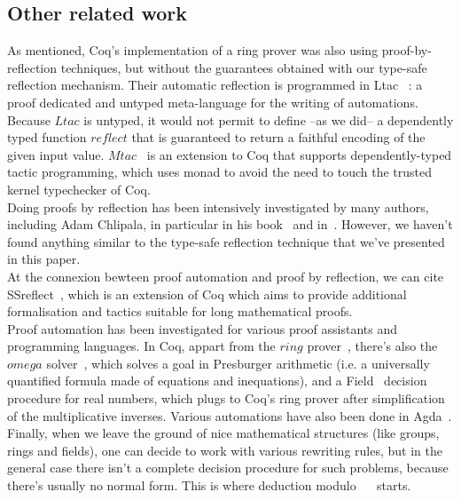 	\subsection{Other related work}
	
As mentioned, Coq's implementation of a ring prover was also using proof-by-reflection techniques, but without the guarantees obtained with our type-safe reflection mechanism. Their automatic reflection is programmed in Ltac~\cite{DelahayeLTac} : a proof dedicated and untyped meta-language for the writing of automations. Because $Ltac$ is untyped, it would not permit to define --as we did-- a dependently typed function $reflect$ that is guaranteed to return a faithful encoding of the given input value. $Mtac$~\cite{Ziliani13} is an extension to Coq that supports dependently-typed tactic programming, which uses monad to avoid the need to touch the trusted kernel typechecker of Coq.
\\

Doing proofs by reflection has been intensively investigated by many authors, including Adam Chlipala, in particular in his book~\cite{ChlipalaBook} and in~\cite{Malecha14}. However, we haven't found anything similar to the type-safe reflection technique that we've presented in this paper. 
\\

At the connexion bewteen proof automation and proof by reflection, we can cite SSreflect~\cite{GonthierTuto}, which is an extension of Coq which aims to provide additional formalisation and tactics suitable for long mathematical proofs.
\\

Proof automation has been investigated for various proof assistants and programming languages. In Coq, appart from the $ring$ prover~\cite{Coq2005}, there's also the $omega$ solver~\cite{Cregut04}, which solves a goal in Presburger arithmetic (i.e. a universally quantified formula made of equations and inequations), and a Field~\cite{DelahayeField} decision procedure for real numbers, which plugs to Coq's ring prover after simplification of the multiplicative inverses. Various automations have also been done in Agda~\cite{Lindblad04}.
\\

Finally, when we leave the ground of nice mathematical structures (like groups, rings and fields), one can decide to work with various rewriting rules, but in the general case there isn't a complete decision procedure for such problems, because there's usually no normal form. This is where deduction modulo~\cite{Dowek03} ~\cite{DelahayeModulo} starts.


